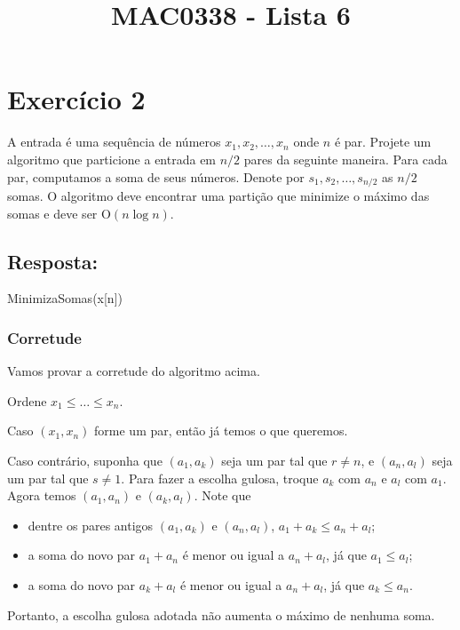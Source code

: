 \documentclass{article}
\title{MAC0338 - Lista 6}
\author{}
\date{}
\begin{document}
\maketitle

\section*{Exercício 2}
A entrada é uma sequência de números $x_1, x_2, \dots, x_n$ onde $n$ é par.
Projete um algoritmo que particione a entrada em $n/2$ pares da seguinte maneira. Para cada par, computamos a soma de seus números. Denote por $s_1, s_2, \dots , s_{n/2}$ as $n/2$ somas. O algoritmo deve encontrar uma partição que minimize o máximo das somas e deve ser O$(n \log n)$.

\bigskip

\subsection*{Resposta:}

\begin{algorithm}
  \caption{MinimizaSomas(x[n])}
  \label{alg:MinimizaSomas}
\end{algorithm}

\subsubsection*{Corretude}
Vamos provar a corretude do algoritmo acima.

Ordene $x_1 \leq  \dots \leq x_n$.

Caso $(x_1, x_n)$ forme um par, então já temos o que queremos.

Caso contrário, suponha que $(a_1,a_k)$ seja um par tal que $r \neq n$, e $(a_n,a_l)$ seja um par tal que $s \neq 1$. Para fazer a escolha gulosa, troque $a_k$ com $a_n$ e $a_l$ com $a_1$. Agora temos $(a_1,a_n)$ e $(a_k,a_l)$. Note que
\begin{itemize}
  \item dentre os pares antigos $(a_1,a_k)$ e $(a_n,a_l)$, $a_1+a_k \leq a_n+a_l$;
  \item a soma do novo par $a_1+a_n$ é menor ou igual a $a_n+a_l$, já que $a_1 \leq a_l$;
  \item a soma do novo par $a_k+a_l$ é menor ou igual a $a_n+a_l$, já que $a_k \leq a_n$.
\end{itemize}
Portanto, a escolha gulosa adotada não aumenta o máximo de nenhuma soma.
\end{document}
